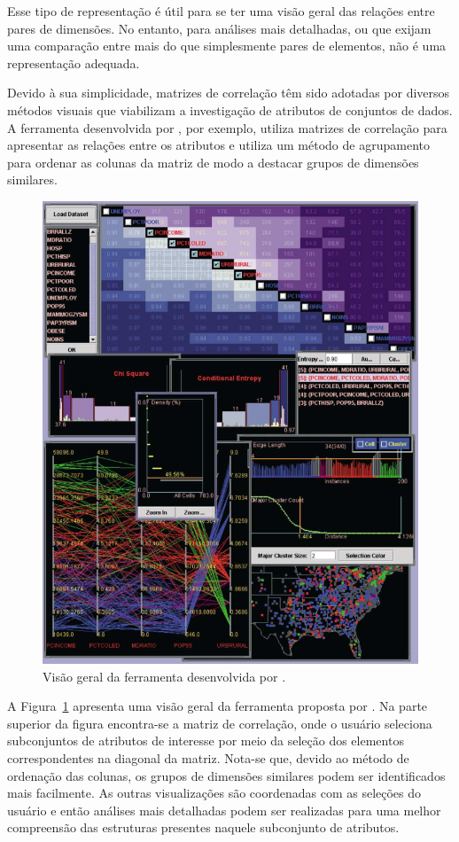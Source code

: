 Esse tipo de representação é útil para se ter uma visão
geral das relações entre pares de dimensões. No entanto,
para análises mais detalhadas, ou que exijam uma comparação
entre mais do que simplesmente pares de elementos, não é uma
representação adequada.

Devido à sua simplicidade, matrizes de correlação têm sido
adotadas por diversos métodos visuais que viabilizam a
investigação de atributos de conjuntos de dados. A
ferramenta desenvolvida por \citet{Guo2003}, por exemplo,
utiliza matrizes de correlação para apresentar as relações
entre os atributos e utiliza um método de agrupamento para
ordenar as colunas da matriz de modo a destacar grupos de
dimensões similares.

\begin{figure}[h!]
    \centering
    \includegraphics[width=12cm]{images/coord.png}
    \caption[Ferramenta proposta por \cite{Guo2003}]
    {Visão geral da ferramenta desenvolvida por
    \citet{Guo2003}.} 
    \label{fig:coord}
\end{figure}

A Figura~\ref{fig:coord} apresenta uma visão geral da
ferramenta proposta por \citet{Guo2003}. Na parte superior
da figura encontra-se a matriz de correlação, onde o usuário
seleciona subconjuntos de atributos de interesse por meio da
seleção dos elementos correspondentes na diagonal da matriz.
Nota-se que, devido ao método de ordenação das colunas,
os grupos de dimensões similares podem ser identificados
mais facilmente. As outras visualizações são coordenadas com
as seleções do usuário e então análises mais detalhadas podem
ser realizadas para uma melhor compreensão das estruturas
presentes naquele subconjunto de atributos. 

